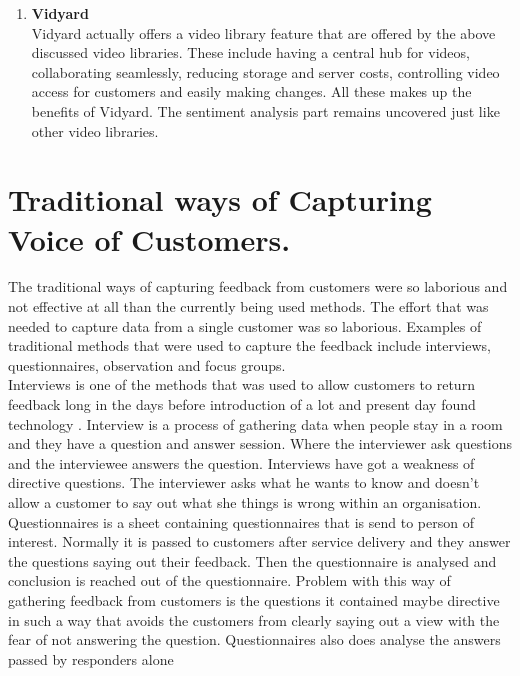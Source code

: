 \documentclass[12pt]{report}
\begin{document}
\begin{enumerate}
	\item \textbf{Vidyard}\\ 
	Vidyard actually offers a video library feature that are offered by the above discussed video libraries. These include having a central hub for videos, collaborating seamlessly, reducing storage and server costs, controlling video access for customers and easily making changes. All these makes up the benefits of Vidyard. The sentiment analysis part remains uncovered just like other video libraries.\\
	
\end{enumerate}

\section{Traditional ways of Capturing Voice of Customers.}
The traditional ways of capturing feedback from customers were so laborious and not effective at all than the currently being used methods. The effort that was needed to capture data from a single customer was so laborious. Examples of traditional methods that were used to capture the feedback include interviews, questionnaires, observation and focus groups. \\

Interviews is one of the methods that was used to allow customers to return feedback long in the days before introduction of a lot and present day found technology \citep{interview}. Interview is a process of gathering data when people stay in a room and they have a question and answer session. Where the interviewer ask questions and the interviewee answers the question. Interviews have got a weakness of directive questions. The interviewer asks what he wants to know and doesn’t allow a customer to say out what she things is wrong within an organisation. \\

Questionnaires is a sheet containing questionnaires that is send to person of interest. Normally it is passed to customers after service delivery and they answer the questions saying out their feedback. Then the questionnaire is analysed and conclusion is reached out of the questionnaire. Problem with this way of gathering feedback from customers is the questions it contained maybe directive in such a way that avoids the customers from clearly saying out a view with the fear of not answering the question. Questionnaires also does analyse the answers passed by responders alone \cite{mann1998not}\\
\end{document}
